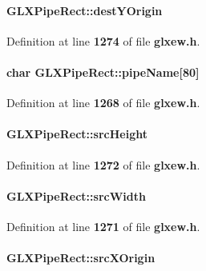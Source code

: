 \paragraph[{dest\+Y\+Origin}]{ G\+L\+X\+Pipe\+Rect\+::dest\+Y\+Origin}\label{structGLXPipeRect_aef7766b02ef07c20a11e89da5878b469}


Definition at line {\bf 1274} of file {\bf glxew.\+h}.

\paragraph[{pipe\+Name}]{\setlength{\rightskip}{0pt plus 5cm}char G\+L\+X\+Pipe\+Rect\+::pipe\+Name[80]}\label{structGLXPipeRect_a88e732f4d56b659b0366aabd6bc362dc}


Definition at line {\bf 1268} of file {\bf glxew.\+h}.

\paragraph[{src\+Height}]{ G\+L\+X\+Pipe\+Rect\+::src\+Height}\label{structGLXPipeRect_a35632524bce6bffa05f284a9b1c1b8ff}


Definition at line {\bf 1272} of file {\bf glxew.\+h}.

\paragraph[{src\+Width}]{ G\+L\+X\+Pipe\+Rect\+::src\+Width}\label{structGLXPipeRect_a2c6c180a4dabb71076366e06a1c7d0ef}


Definition at line {\bf 1271} of file {\bf glxew.\+h}.

\paragraph[{src\+X\+Origin}]{ G\+L\+X\+Pipe\+Rect\+::src\+X\+Origin}\label{structGLXPipeRect_a9df2313c01f75d149e64f2ff467bc266}


